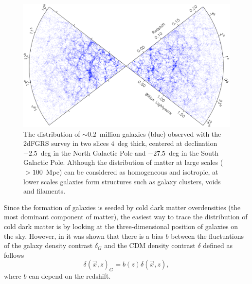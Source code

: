 \begin{figure}
\centering
\includegraphics[width=130mm]{./plots/2dFzcone_big.png}
\caption{The distribution of $\sim 0.2$~million galaxies (blue) observed with the 2dFGRS survey \citep{Colless2001} in two slices $4$~deg thick, centered at declination $-2.5$~deg in the North Galactic Pole and $-27.5$~deg in the South Galactic Pole. Although the distribution of matter at large scales ($>100$~Mpc) can be considered as homogeneous and isotropic, at lower scales galaxies form structures such as galaxy clusters, voids and filaments.}
\label{fig:2dfzcone}
\end{figure}
Since the formation of galaxies is seeded by cold dark matter overdensities (the most dominant component of matter), the easiest way to trace the distribution of cold dark matter is by looking at the three-dimensional position of galaxies on the sky. However, in \citet{Fry1993} it was shown that there is a bias $b$ between the fluctuations of the galaxy density contrast $\delta_G$ and the CDM density contrast $\delta$ defined as follows
\begin{equation}
\delta(\vec{x},z)_G = b(z) \delta(\vec{x},z),
\label{eq:bias}
\end{equation}
where $b$ can depend on the redshift.

